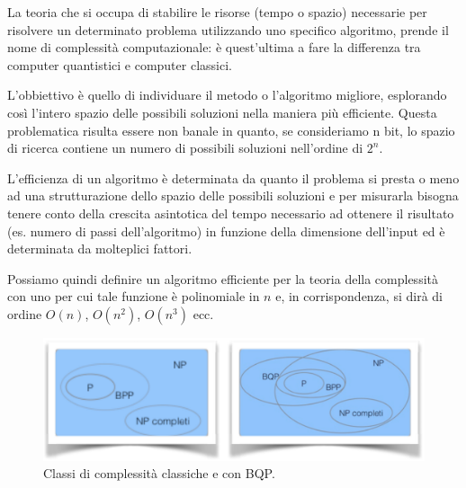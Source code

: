 La teoria che si occupa di stabilire le risorse (tempo o spazio) necessarie per risolvere un determinato problema utilizzando uno specifico algoritmo, prende il nome di complessità computazionale: è quest'ultima a fare la differenza tra computer quantistici e computer classici.

L'obbiettivo è quello di individuare il metodo o l'algoritmo migliore, esplorando così l'intero spazio delle possibili soluzioni nella maniera più efficiente.
Questa problematica risulta essere non banale in quanto, se consideriamo n bit, lo spazio di ricerca contiene un numero di possibili soluzioni nell'ordine di $2^n$.

L'efficienza di un algoritmo è determinata da quanto il problema si presta o meno ad una strutturazione dello spazio delle possibili soluzioni e per misurarla bisogna tenere conto della crescita asintotica del tempo necessario ad ottenere il risultato (es. numero di passi dell'algoritmo) in funzione della dimensione dell'input ed è determinata da molteplici fattori.

Possiamo quindi definire un algoritmo efficiente per la teoria della complessità con uno per cui tale funzione è polinomiale in $n$ e, in corrispondenza, si dirà di ordine $O(n)$, $O(n^2)$, $O(n^3)$ ecc.
\begin{figure}[htp]
    \centering
    \includegraphics[width=12cm]{Images/Capitolo2/classi_complessita.png}
    \caption{Classi di complessità classiche e con BQP.}
    \label{fig:classi_complessita}
\end{figure}
\newline\newline

